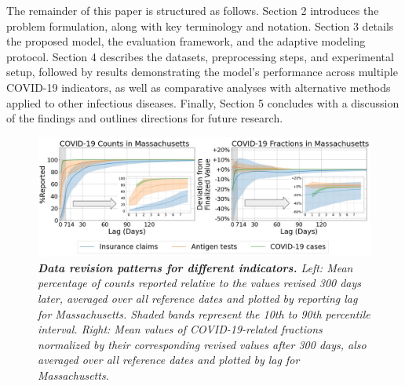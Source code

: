 The remainder of this paper is structured as follows. Section 2 introduces the problem formulation, along with key terminology and notation. Section 3 details the proposed model, the evaluation framework, and the adaptive modeling protocol. Section 4 describes the datasets, preprocessing steps, and experimental setup, followed by results demonstrating the model’s performance across multiple COVID-19 indicators, as well as comparative analyses with alternative methods applied to other infectious diseases. Finally, Section 5 concludes with a discussion of the findings and outlines directions for future research.

\begin{figure}[h!]
    \centering
    \includegraphics[width=\textwidth]{figs/Intro_fig.pdf}
    \caption{\textit{\textbf{Data revision patterns for different indicators.} Left: Mean percentage of counts reported relative to the values revised 300 days later, averaged over all reference dates and plotted by reporting lag for Massachusetts. Shaded bands represent the 10th to 90th percentile interval. Right: Mean values of COVID-19-related fractions normalized by their corresponding revised values after 300 days, also averaged over all reference dates and plotted by lag for Massachusetts.}}

\end{figure}




